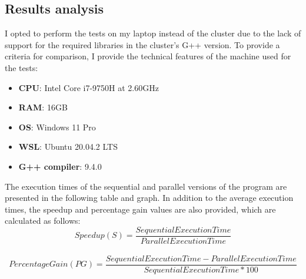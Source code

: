 \documentclass{article}
\begin{document}
\subsection*{Results analysis}
I opted to perform the tests on my laptop instead of the cluster due to the lack of support for the required libraries in the cluster's G++ version.
To provide a criteria for comparison, I provide the technical features of the machine used for the tests:
\begin{itemize}
    \item \textbf{CPU}: Intel\textsuperscript{\textregistered} Core\textsuperscript{\texttrademark} i7-9750H at 2.60GHz
    \item \textbf{RAM}: 16GB
    \item \textbf{OS}: Windows 11 Pro
    \item \textbf{WSL}: Ubuntu 20.04.2 LTS
    \item \textbf{G++ compiler}: 9.4.0
\end{itemize}



The execution times of the sequential and parallel versions of the program are presented in the following table and graph.
In addition to the average execution times, the speedup and percentage gain values are also provided, which are calculated as follows:
\begin{equation}
    Speedup(S) = \frac{Sequential Execution Time}{Parallel Execution Time}
\end{equation} \\
\begin{equation}
    Percentage Gain(PG) = \frac{Sequential Execution Time - Parallel Execution Time}{Sequential Execution Time * 100}
\end{equation}
\end{document}
